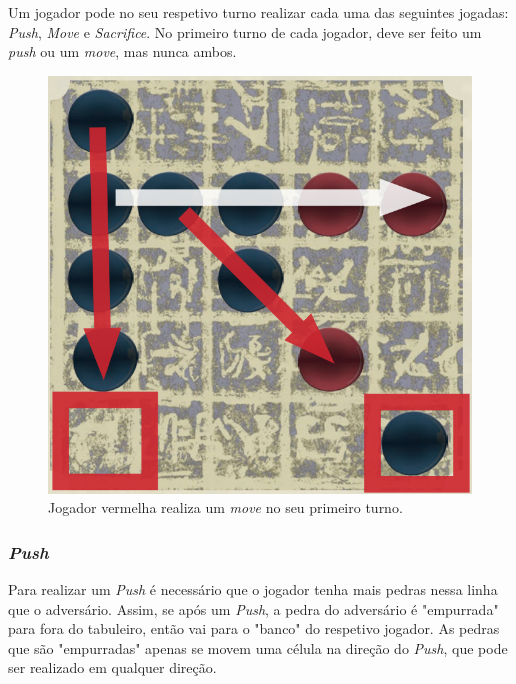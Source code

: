 \documentclass[a4paper]{article}
\begin{document}
Um jogador pode no seu respetivo turno realizar cada uma das seguintes jogadas: \textit{Push}, \textit{Move} e \textit{Sacrifice}.
No primeiro turno de cada jogador, deve ser feito um \textit{push} ou um \textit{move}, mas nunca ambos.

\begin{figure}[!htb]
\centering
\includegraphics[scale=0.3]{push2.png}
\caption{Jogador vermelha realiza um \textit{move} no seu primeiro turno.}
\end{figure}

\subsubsection{\textit{Push}}

Para realizar um  \textit{Push} é necessário que o jogador tenha mais pedras nessa linha que o adversário. Assim, se após um  \textit{Push}, a pedra do adversário é "empurrada" para fora do tabuleiro, então vai para o "banco" do respetivo jogador. As pedras que são "empurradas" apenas se movem uma célula na direção do \textit{Push}, que pode ser realizado em qualquer direção.
\end{document}
